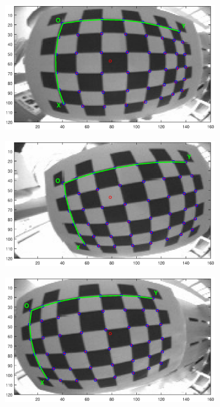 \begin{figure}[h]
    \centering
    \begin{subfigure}[b]{0.4\textwidth}
        \centering
        \includegraphics[width=\textwidth]{images/camera/Reproj7.eps}
    \end{subfigure}
    \begin{subfigure}[b]{0.4\textwidth}
        \centering
        \includegraphics[width=\textwidth]{images/camera/Reproj6.eps}
    \end{subfigure}
    \begin{subfigure}[b]{0.4\textwidth}
        \centering
        \includegraphics[width=\textwidth]{images/camera/Reproj5.eps}

\end{subfigure}
\end{figure}
